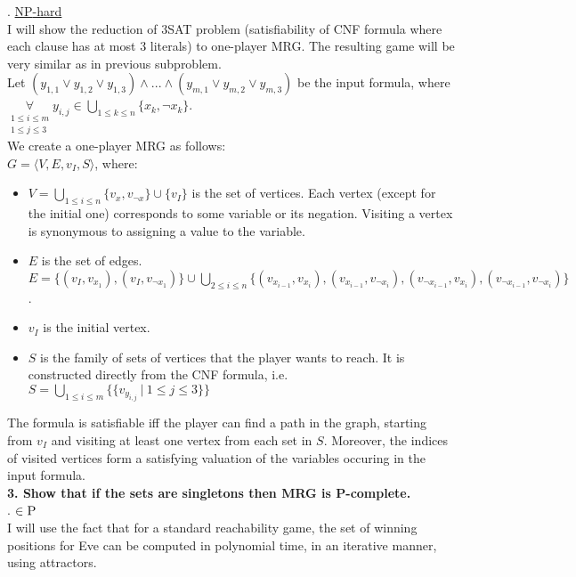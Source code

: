 . \underline{\textsc{NP}-hard}\\
I will show the reduction of 3SAT problem (satisfiability of CNF formula where each clause has at most 3 literals) to
one-player MRG. The resulting game will be very similar as in previous subproblem.\\
Let $(y_{1,1} \lor y_{1,2} \lor y_{1,3}) \land ... \land (y_{m,1} \lor y_{m,2} \lor y_{m,3})$ be the input formula,
where $\underset{\substack{1 \leq i \leq m\\1 \leq j \leq 3}}{\forall} y_{i,j} \in \underset{1 \leq k \leq n}{\bigcup} \{ x_k, \lnot x_k \}$.\\
We create a one-player MRG as follows:\\
$G = \langle V, E, v_I, S \rangle$, where:
\begin{itemize}
      \item $V = \underset{1 \leq i \leq n}{\bigcup} \{v_x, v_{\lnot x}\} \cup \{v_I\}$ is the set of vertices.
            Each vertex (except for the initial one) corresponds to some variable or its negation. Visiting a
            vertex is synonymous to assigning a value to the variable.
      \item $E$ is the set of edges.
            $E = \{(v_I, v_{x_1}), (v_I, v_{\lnot x_1})\} \cup
            \underset{2 \leq i \leq n}{\bigcup} \{ (v_{x_{i-1}}, v_{x_i}), (v_{x_{i-1}}, v_{\lnot x_i}),
            (v_{\lnot x_{i-1}}, v_{x_i}), (v_{\lnot x_{i-1}}, v_{\lnot x_i}) \}$.
      \item $v_I$ is the initial vertex.
      \item $S$ is the family of sets of vertices that the player wants to reach.
            It is constructed directly from the CNF formula, i.e.
            $S = \underset{1 \leq i \leq m}{\bigcup} \{ \{ v_{y_{i,j}}\ |\ 1 \leq j \leq 3 \} \}$
\end{itemize}
The formula is satisfiable iff the player can find a path in the graph, starting from $v_I$ and visiting
at least one vertex from each set in $S$. Moreover, the indices of visited vertices form a satisfying valuation
of the variables occuring in the input formula.\\

\noindent
\textbf{3. Show that if the sets are singletons then MRG is P-complete.}\\

. \underline{$\in \textsc{P}$}\\
I will use the fact that for a standard reachability game, the set of winning positions for Eve can be
computed in polynomial time, in an iterative manner, using attractors.\\

